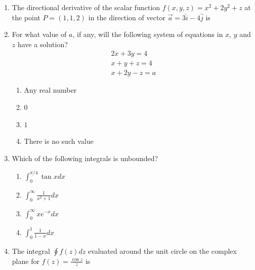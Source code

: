 \documentclass[journal,12pt,onecolumn]{IEEEtran}
\begin{document}
\begin{enumerate}
    \item The directional derivative of the scalar function $f(x,y,z) = x^2 + 2y^2 + z$ at the point $P=(1,1,2)$ in the direction of vector $\overrightarrow{a} = 3\hat{i} -4\hat{j}$ is
          \begin{enumerate}
          \end{enumerate}
    \item For what value of $a$, if any, will the following system of equations in $x$, $y$ and $z$ have a solution?
          \begin{align}
              2x+3y=4 \\
              x+y+z=4 \\
              x+2y-z=a
          \end{align}

          \begin{enumerate}
              \item Any real number
              \item $0$
              \item $1$
              \item There is no such value
          \end{enumerate}
    \item Which of the following integrals is unbounded?

          \begin{enumerate}
              \item $\int_{0}^{\pi/4}{\tan x dx}$
              \item $\int_{0}^{\infty}{\frac{1}{x^2+1} dx}$
              \item $\int_{0}^{\infty}{xe^{-x} dx}$
              \item $\int_{0}^{1}{\frac{1}{1-x} dx}$
          \end{enumerate}

    \item The integral $\oint{f(z)dz}$ evaluated around the unit circle on the complex plane for $f(z) = \frac{\cos z}{z}$ is\\


\end{enumerate}
\end{document}
